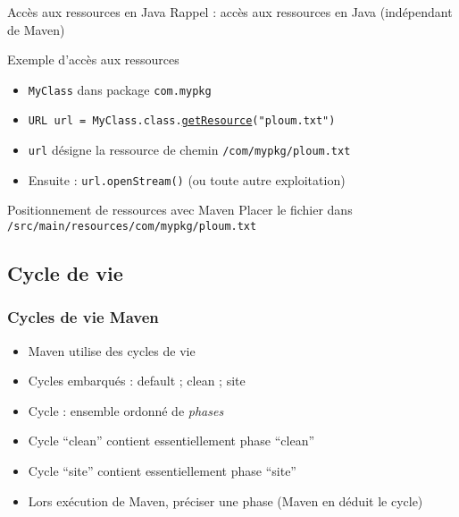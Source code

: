 \documentclass[english, french]{beamer}
\begin{document}
\begin{frame}{Accès aux ressources en Java}
	Rappel : accès aux ressources en Java (indépendant de Maven)
	\begin{exampleblock}{Exemple d’accès aux ressources}
		\begin{itemize}
			\item \texttt{MyClass} dans package \texttt{com.mypkg}
			\item \texttt{URL url = MyClass.class.\href{https://docs.oracle.com/javase/8/docs/api/java/lang/Class.html\#getResource-java.lang.String-}{getResource}("ploum.txt")}
			\item \texttt{url} désigne la ressource de chemin \texttt{/com/mypkg/ploum.txt}
			\item Ensuite : \texttt{url.openStream()} (ou toute autre exploitation)
		\end{itemize}
	\end{exampleblock}
	\begin{block}{Positionnement de ressources avec Maven}
		Placer le fichier dans \texttt{/src/main/resources/com/mypkg/ploum.txt}
	\end{block}
\end{frame}

\subsection{Cycle de vie}
\begin{frame}
	\frametitle{Cycles de vie Maven}
	\begin{itemize}
		\item Maven utilise des cycles de vie
		\item Cycles embarqués : default ; clean ; site
		\item Cycle : ensemble ordonné de \emph{phases}
		\item Cycle “clean” contient {\tiny essentiellement} phase “clean”
		\item Cycle “site” contient {\tiny essentiellement} phase “site”
		\item Lors exécution de Maven, préciser une phase (Maven en déduit le cycle)
	\end{itemize}
\end{frame}
\end{document}
